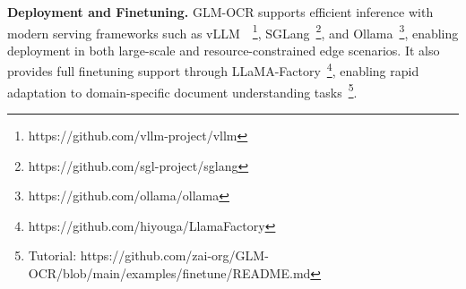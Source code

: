 \textbf{Deployment and Finetuning.} GLM-OCR supports efficient inference with modern serving frameworks such as vLLM~\cite{vllm}~\footnote{https://github.com/vllm-project/vllm}, SGLang~\footnote{https://github.com/sgl-project/sglang}, and Ollama~\footnote{https://github.com/ollama/ollama}, enabling deployment in both large-scale and resource-constrained edge scenarios. It also provides full finetuning support through LLaMA-Factory~\footnote{https://github.com/hiyouga/LlamaFactory}, enabling rapid adaptation to domain-specific document understanding tasks~\footnote{Tutorial: https://github.com/zai-org/GLM-OCR/blob/main/examples/finetune/README.md}. 






